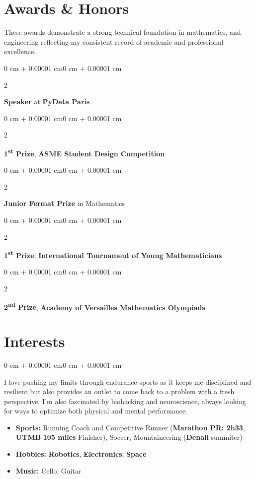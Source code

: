 \documentclass[10pt, letterpaper]{article}
\newenvironment{highlightsforbulletentries}{
    \begin{itemize}[
        topsep=0.10 cm,
        parsep=0.10 cm,
        partopsep=0pt,
        itemsep=0pt,
        leftmargin=1.5 cm
    ]
}{
    \end{itemize}
}
\newenvironment{onecolentry}{
    \begin{adjustwidth}{0 cm + 0.00001 cm}{0 cm + 0.00001 cm}
}{
    \end{adjustwidth}
}
\newenvironment{twocolentry}[2][]{
    \onecolentry
    \def\secondColumn{#2}
    \setcolumnwidth{\fill, 4.5 cm}
    \begin{paracol}{2}
}{
    \switchcolumn \raggedleft \secondColumn
    \end{paracol}
    \endonecolentry
}
\begin{document}
    \section{Awards \& Honors}
    These awards demonstrate a strong technical foundation in mathematics, and engineering reflecting my consistent record of academic and professional excellence.
    \begin{twocolentry}{2015}
        \textbf{Speaker} at \textbf{PyData Paris}
    \end{twocolentry}

    \begin{twocolentry}{2012}
        \textbf{1\textsuperscript{st} Prize}, \textbf{ASME Student Design Competition}
    \end{twocolentry}

    \begin{twocolentry}{2010}
        \textbf{Junior Fermat Prize} in Mathematics
    \end{twocolentry}

    \begin{twocolentry}{2010}
        \textbf{1\textsuperscript{st} Prize}, \textbf{International Tournament of Young Mathematicians}
    \end{twocolentry}

    \begin{twocolentry}{2008}
        \textbf{2\textsuperscript{nd} Prize}, \textbf{Academy of Versailles Mathematics Olympiads}
    \end{twocolentry}

    \section{Interests}
    \begin{onecolentry}
        I love pushing my limits through endurance sports as it keeps me disciplined and resilient but also provides an outlet to come back to a problem with a fresh perspective.  I'm also fascinated by biohacking and neuroscience, always looking for ways to optimize both physical and mental performance.
        \begin{highlightsforbulletentries}
            \item \textbf{Sports:} Running Coach and Competitive Runner (\textbf{Marathon PR: 2h33}, \textbf{UTMB} \textbf{105 miles} Finisher), Soccer, Mountaineering (\textbf{Denali} summiter)
            \item \textbf{Hobbies:} \textbf{Robotics}, \textbf{Electronics}, \textbf{Space}
            \item \textbf{Music:} Cello, Guitar
        \end{highlightsforbulletentries}
    \end{onecolentry}
\end{document}
